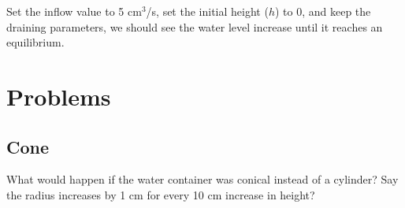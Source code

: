 \documentclass[11pt,fleqn]{book}
\begin{document}
		Set the inflow value to 5 cm$^3$/s, set the initial height ($h$) to 0, and keep the draining parameters, we should see the water level increase until it reaches an equilibrium.
	

	\section{Problems}
	
	\subsection{Cone}
		What would happen if the water container was conical instead of a cylinder? Say the radius increases by 1 cm for every 10 cm increase in height?

 
\end{document}
